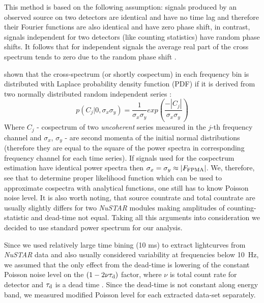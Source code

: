 \documentclass[a4paper,fleqn,usenatbib]{mnras}
\begin{document}
This method is based on the following assumption: signals produced by an observed source on two detectors are identical and have no time lag and therefore their Fourier functions are also identical and have zero phase shift, in contrast, signals independent for two detectors (like counting statistics) have random phase shifts.  
It follows that for independent signals the average real part of the cross spectrum tends to zero due to the random phase shift .

\citet{2017arXiv170909666H} shown that the cross-spectrum (or shortly cospectum) in each frequency bin is distributed with Laplace probability density function (PDF) if it is derived from two normally distributed random independent series \citep[see, e.q. 14 in ][]{2017arXiv170909666H}:
\begin{equation}
        p(C_{j}|0, \sigma_x \sigma_y) = \frac{1}{\sigma_x \sigma_y} exp{\left(\frac{-|C_{j}|}{\sigma_x \sigma_y} \right)}
\end{equation}
Where $C_{j}$ - cospectrum of two {\it uncoherent} series measured in the $j$-th frequency channel and $\sigma_x$, $\sigma_y$ - are second momenta of the initial normal distributions (therefore they are equal to the square of the power spectra in corresponding frequency channel for each time series).
If signals used for the cospectrum estimation have identical power spectra then $\sigma_x = \sigma_y \approx |F_{\rm FPMA}|$.
We, therefore, see that to determine proper likelihood function which can be used to approximate cospectra with analytical functions, one still has to know Poisson noise level.
It is also worth noting, that source countrate and total countrate are usually slightly differs for two {\it NuSTAR} modules making amplitudes of counting-statistic and dead-time not equal.
Taking all this arguments into consideration we decided to use standard power spectrum for our analysis.

Since we used relatively large time bining (10 ms) to extract lightcurves from {\it NuSTAR} data and also usually considered variability at frequencies below 10~Hz, we assumed that the only effect from the dead-time is lowering of the constant Poisson noise level on the $(1 - 2\nu \tau_{\rm d})$ factor, where $\nu$ is total count rate for detector and $\tau_{\rm d}$ is a dead time \citep{1994A&A...287...73V, 1995ApJ...449..930Z}. 
Since the dead-time is not constant along energy band, we measured modified Poisson level for each extracted data-set separately.
\end{document}
